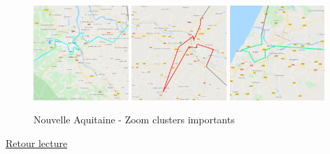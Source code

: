 \documentclass[12pt]{article}
\begin{document}
\begin{figure}[H]
\caption{Nouvelle Aquitaine - Zoom clusters importants}
\begin{center}
\includegraphics[width=0.32\textwidth]{NAcluster1}
\includegraphics[width=0.32\textwidth]{NAcluster2}
\includegraphics[width=0.32\textwidth]{NAcluster3}
\end{center}
\end{figure}

\hyperlink{Ref2}{Retour lecture}
\end{document}
